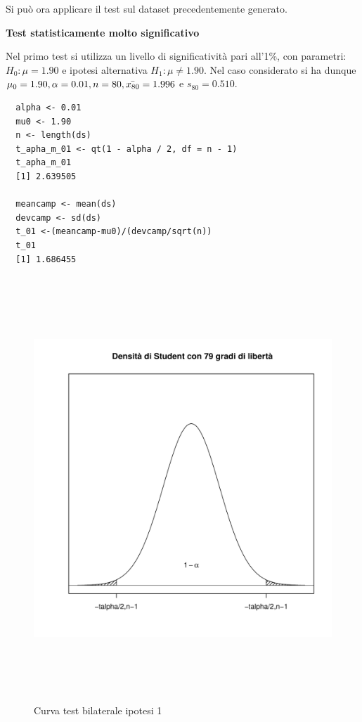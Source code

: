 Si può ora applicare il test sul dataset precedentemente generato.

\vspace{5mm}
\noindent \textbf{Test statisticamente molto significativo}

Nel primo test si utilizza un livello di significatività pari all'1\%, con parametri: $H_0: \mu = 1.90$ e ipotesi alternativa $H_1: \mu \neq 1.90$. Nel caso considerato si ha dunque $\mu_0 = 1.90, \alpha = 0.01, n = 80, \Bar{x_{80}} = 1.996$ e $s_{80} = 0.510$.

\vspace{5mm}
\begin{lstlisting}
  alpha <- 0.01
  mu0 <- 1.90
  n <- length(ds)
  t_apha_m_01 <- qt(1 - alpha / 2, df = n - 1)
  t_apha_m_01
  [1] 2.639505

  meancamp <- mean(ds)
  devcamp <- sd(ds)
  t_01 <-(meancamp-mu0)/(devcamp/sqrt(n))
  t_01
  [1] 1.686455
\end{lstlisting}

\begin{figure}[!htb]
    \centering
    \includegraphics[height=16cm]{capitoli/images/3_verifica_ipotesi/curvehp1.pdf}
    \caption{Curva test bilaterale ipotesi 1}
\end{figure}

